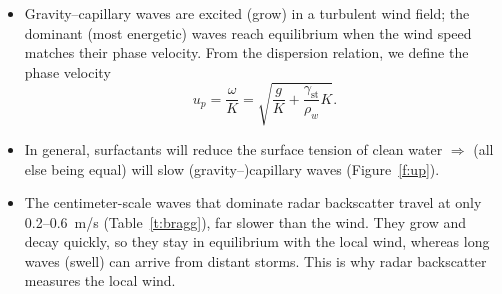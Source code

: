 \documentclass[11pt, oneside]{article}
\begin{document}
\begin{itemize}
	\item Gravity--capillary waves are excited (grow) in a turbulent wind field; the dominant (most energetic) waves reach equilibrium when the wind speed matches their phase velocity. From the dispersion relation, we define the phase velocity
	\begin{equation}
		\label{e:up}
		u_p = \frac{\omega}{K} = \sqrt{\frac{g}{K} + \frac{\gamma_\mathrm{st}}{\rho_w}K}.
	\end{equation}
	\item In general, surfactants will reduce the surface tension of clean water $\Rightarrow$ (all else being equal) will slow (gravity--)capillary waves (Figure~\ref{f:up}).
	\item The centimeter-scale waves that dominate radar backscatter travel at only 0.2--0.6~m/s (Table~\ref{t:bragg}), far slower than the wind. They grow and decay quickly, so they stay in equilibrium with the local wind, whereas long waves (swell) can arrive from distant storms. This is why radar backscatter measures the local wind.
\end{itemize}
\end{document}

